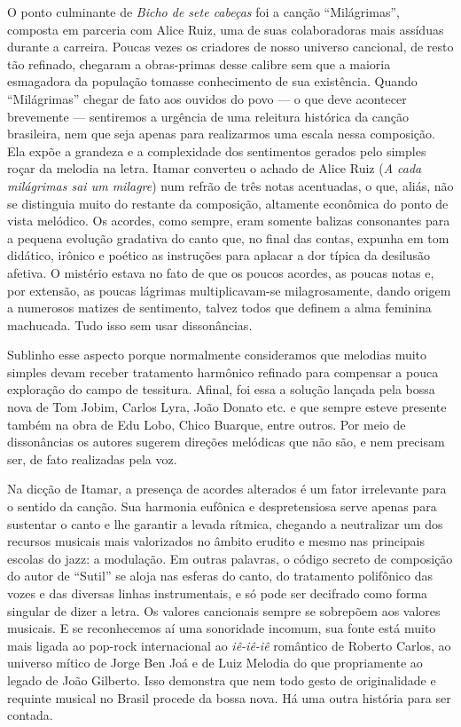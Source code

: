 O ponto culminante de \textit{Bicho de sete cabeças} foi a canção ``Milágrimas'', composta em parceria com Alice Ruiz, uma de suas colaboradoras mais
assíduas durante a carreira. Poucas vezes os criadores de nosso universo
cancional, de resto tão refinado, chegaram a obras-primas desse calibre
sem que a maioria esmagadora da população tomasse conhecimento de sua
existência. Quando ``Milágrimas'' chegar de fato aos ouvidos do povo --- o que
deve acontecer brevemente --- sentiremos a urgência de uma releitura
histórica da canção brasileira, nem que seja apenas para realizarmos uma
escala nessa composição. Ela expõe a grandeza e a complexidade dos
sentimentos gerados pelo simples roçar da melodia na letra. Itamar
converteu o achado de Alice Ruiz (\textit{A cada milágrimas sai um milagre})
num refrão de três notas acentuadas, o que, aliás, não se distinguia
muito do restante da composição, altamente econômica do ponto de vista
melódico. Os acordes, como sempre, eram somente balizas consonantes para
a pequena evolução gradativa do canto que, no final das contas, expunha
em tom didático, irônico e poético as instruções para aplacar a dor
típica da desilusão afetiva. O mistério estava no fato de que os poucos
acordes, as poucas notas e, por extensão, as poucas lágrimas
multiplicavam-se milagrosamente, dando origem a numerosos matizes de
sentimento, talvez todos que definem a alma feminina machucada. Tudo
isso sem usar dissonâncias.

Sublinho esse aspecto porque normalmente consideramos que melodias muito
simples devam receber tratamento harmônico refinado para compensar a
pouca exploração do campo de tessitura. Afinal, foi essa a solução
lançada pela bossa nova de Tom Jobim, Carlos Lyra, João Donato etc. e
que sempre esteve presente também na obra de Edu Lobo, Chico Buarque,
entre outros. Por meio de dissonâncias os autores sugerem direções
melódicas que não são, e nem precisam ser, de fato realizadas pela voz.

Na dicção de Itamar, a presença de acordes alterados é um fator
irrelevante para o sentido da canção. Sua harmonia eufônica e
despretensiosa serve apenas para sustentar o canto e lhe garantir a
levada rítmica, chegando a neutralizar um dos recursos musicais mais
valorizados no âmbito erudito e mesmo nas principais escolas do jazz: a
modulação. Em outras palavras, o código secreto de composição do autor
de ``Sutil'' se aloja nas esferas do canto, do tratamento polifônico das
vozes e das diversas linhas instrumentais, e só pode ser decifrado como
forma singular de dizer a letra. Os valores cancionais sempre se
sobrepõem aos valores musicais. E se reconhecemos aí uma sonoridade
incomum, sua fonte está muito mais ligada ao pop-rock internacional ao
\textit{iê-iê-iê} romântico de Roberto Carlos, ao universo mítico de Jorge Ben
Joá e de Luiz Melodia do que propriamente ao legado de João Gilberto.
Isso demonstra que nem todo gesto de originalidade e requinte musical
no Brasil procede da bossa nova. Há uma outra história para ser contada.

